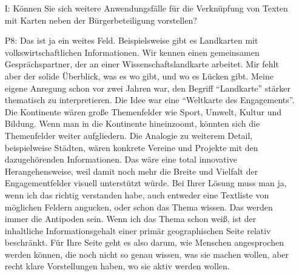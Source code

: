 \begin{itemize}
    \item[I:] K{\"o}nnen Sie sich weitere Anwendungsf{\"a}lle f{\"u}r die Verkn{\"u}pfung von Texten mit Karten neben der B{\"u}rgerbeteiligung vorstellen?
    \item[P8:] Das ist ja ein weites Feld. Beispielsweise gibt es Landkarten mit volkswirtschaftlichen Informationen. Wir kennen einen gemeinsamen Gespr{\"a}chspartner, der an einer Wissenschaftslandkarte arbeitet. Mir fehlt aber der solide {\"U}berblick, was es wo gibt, und wo es L{\"u}cken gibt. Meine eigene Anregung schon vor zwei Jahren war, den Begriff "`Landkarte"' st{\"a}rker thematisch zu interpretieren. Die Idee war eine "`Weltkarte des Engagements"'. Die Kontinente w{\"a}ren gro{\ss}e Themenfelder wie Sport, Umwelt, Kultur und Bildung. Wenn man in die Kontinente hineinzoomt, k{\"o}nnten sich die Themenfelder weiter aufgliedern. Die Analogie zu weiterem Detail, beispielweise St{\"a}dten, w{\"a}ren konkrete Vereine und Projekte mit den dazugeh{\"o}renden Informationen. Das w{\"a}re eine total innovative Herangehensweise, weil damit noch mehr die Breite und Vielfalt der Engagementfelder visuell unterst{\"u}tzt w{\"u}rde. Bei Ihrer L{\"o}sung muss man ja, wenn ich das richtig verstanden habe, auch entweder eine Textliste von m{\"o}glichen Feldern angucken, oder schon das Thema wissen. Das werden immer die Antipoden sein. Wenn ich das Thema schon wei{\ss}, ist der inhaltliche Informationsgehalt einer prim{\"a}r geographischen Seite relativ beschr{\"a}nkt. F{\"u}r Ihre Seite geht es also darum, wie Menschen angesprochen werden k{\"o}nnen, die noch nicht so genau wissen, was sie machen wollen, aber recht klare Vorstellungen haben, wo sie aktiv werden wollen.
\end{itemize}

